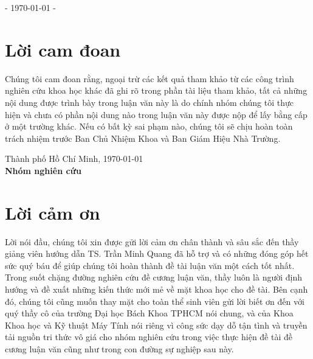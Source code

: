 \documentclass[
11pt, %
vietnam, %
singlespacing, %
parskip, %
headsepline, %
]{MastersDoctoralThesis} %
\begin{document}
\begin{titlepage}
\begin{center}
\vfill

 
\vfill

- { \large \today} -%
 
\vfill
\end{center}
\end{titlepage}

\chapter{Lời cam đoan}
Chúng tôi cam đoan rằng, ngoại trừ các kết quả tham khảo từ các công trình nghiên cứu khoa học khác đã ghi rõ trong phần tài liệu tham khảo, tất cả những nội dung được trình bày trong luận văn này là do chính nhóm chúng tôi thực hiện và chưa có phần nội dung nào trong luận văn này được nộp để lấy bằng cấp ở một trường khác. Nếu có bất kỳ sai phạm nào, chúng tôi sẽ chịu hoàn toàn trách nhiệm trước Ban Chủ Nhiệm Khoa và Ban Giám Hiệu Nhà Trường.\\[1cm]

\begin{minipage}[t]{0.4\textwidth}
\hspace*{1cm}
\end{minipage}
\begin{minipage}[t]{0.6\textwidth}
\begin{center}
Thành phố Hồ Chí Minh, \today\\
\textbf{Nhóm nghiên cứu}
\end{center}
\end{minipage}

\chapter{Lời cảm ơn}
Lời nói đầu, chúng tôi xin được gửi lời cảm ơn chân thành và sâu sắc đến thầy giảng viên hướng dẫn TS. Trần Minh Quang đã hỗ trợ và có những đóng góp hết sức quý báu để giúp chúng tôi hoàn thành đề tài luận văn một cách tốt nhất. Trong suốt chặng đường nghiên cứu đề cương luận văn, thầy luôn là người định hướng và đề xuất những kiến thức mới mẻ về mặt khoa học cho đề tài.
Bên cạnh đó, chúng tôi cũng muốn thay mặt cho toàn thể sinh viên gửi lời biết ơn đến với quý thầy cô của trường Đại học Bách Khoa TPHCM nói chung, và của Khoa Khoa học và Kỹ thuật Máy Tính nói riêng vì công sức dạy dỗ tận tình và truyền tải nguồn tri thức vô giá cho nhóm nghiên cứu trong việc thực hiện đề tài đề cương luận văn cũng như trong con đường sự nghiệp sau này.
\end{document}
